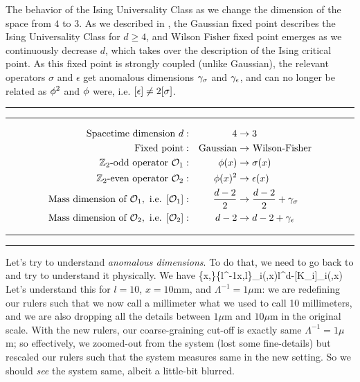 \documentclass[12pt]{article}
\numberwithin{equation}{section}
\begin{document}
\begin{table}
\caption[Ising Universality Class as a function of dimension of the space]{\label{table: ising universality class as dimension changes}The behavior of the Ising Universality Class as we change the dimension of the space from $4$ to $3$. As we described in \secref{\ref{sec: review of RG}}, the Gaussian fixed point describes the Ising Universality Class for $d\ge 4$, and Wilson Fisher fixed point emerges as we continuously decrease $d$, which takes over the description of the Ising critical point. As this fixed point is strongly coupled (unlike Gaussian), the relevant operators $\sigma$ and $\epsilon$ get anomalous dimensions $\gamma_{\sigma}$ and $\gamma_{\epsilon}$, and can no longer be related as $\phi^2$ and $\phi$ were, i.e. $[\epsilon]\ne2[\sigma]$.}
\hrule\hrule
\begin{equation*}
	\begin{aligned}
		\text{Spacetime dimension }d: &&4\rightarrow &\;3\\
		\text{Fixed point}: &&\text{Gaussian}\rightarrow&\text{ Wilson-Fisher}\\
		\mathbb{Z}_2\text{-odd operator }\mathcal{O}_1: &&\phi(x)\rightarrow&\;\sigma(x)
		\\
		\mathbb{Z}_2\text{-even operator }\mathcal{O}_2: &&\phi(x)^2\rightarrow&\;\epsilon(x)
		\\
		\text{Mass dimension of }\mathcal{O}_1,\text{ i.e. }[\mathcal{O}_1]:&&\frac{d-2}{2}\rightarrow&\;\frac{d-2}{2}+\gamma_\sigma
		\\
		\text{Mass dimension of }\mathcal{O}_2,\text{ i.e. }[\mathcal{O}_2]:&&d-2\rightarrow&\; d-2+\gamma_\epsilon
	\end{aligned}
\end{equation*}
\hrule\hrule 
\end{table}

Let's try to understand \emph{anomalous dimensions}. To do that, we need to go back to  and try to understand it physically. We have
\be 
\{x,\Lambda\}\rightarrow\{l^{-1}x,l\Lambda\}\quad\Rightarrow\quad\cO_i(\Lambda,\Lambda x)\rightarrow l^{d-[K_i]}\cO_i(\Lambda,\Lambda x)
\ee 
Let's understand this for $l=10$, $x=10$mm, and $\Lambda^{-1}=1\mu$m: we are redefining our rulers such that we now call a millimeter what we used to call 10 millimeters, and we are also dropping all the details between $1\mu$m and $10\mu$m in the original scale. With the new rulers, our coarse-graining cut-off is exactly same $\Lambda^{-1}=1\mu$m; so effectively, we zoomed-out from the system (lost some fine-details) but rescaled our rulers such that the system measures same in the new setting. So we should \emph{see} the system same, albeit a little-bit blurred.
\end{document}
